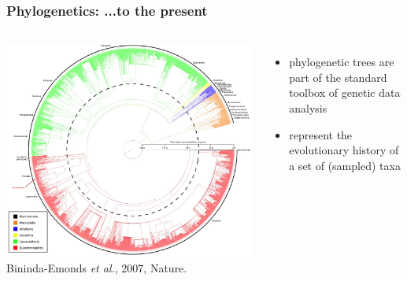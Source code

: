 \documentclass[Xcolor=svgnames,mathserif]{beamer}
\begin{document}






\begin{frame}
  \frametitle{Phylogenetics: ...to the present}

\begin{columns}[c]
	\includegraphics[width=\textwidth]{figs/mammalsTree}\\
	Bininda-Emonds \textit{et al.}, 2007, Nature.
\begin{itemize}
\item phylogenetic trees are part of the standard toolbox of genetic data analysis
\item represent the evolutionary history of a set of (sampled) taxa
\end{itemize}
\end{columns}


\end{frame}
\end{document}
